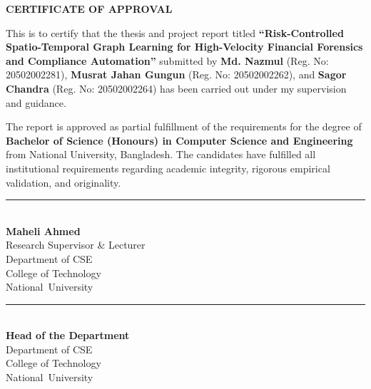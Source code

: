 \begin{center}
   \vspace*{1.0cm}
   {\Large\textbf{CERTIFICATE OF APPROVAL}}\\[1.5cm]
\end{center}

This is to certify that the thesis and project report titled \textbf{``Risk-Controlled Spatio-Temporal Graph Learning for High-Velocity Financial Forensics and Compliance Automation''} submitted by \textbf{Md. Nazmul} (Reg. No: 20502002281), \textbf{Musrat Jahan Gungun} (Reg. No: 20502002262), and \textbf{Sagor Chandra} (Reg. No: 20502002264) has been carried out under my supervision and guidance. 

The report is approved as partial fulfillment of the requirements for the degree of \textbf{Bachelor of Science (Honours) in Computer Science and Engineering} from National University, Bangladesh. The candidates have fulfilled all institutional requirements regarding academic integrity, rigorous empirical validation, and originality.

\vspace{3.5cm}

\noindent
\begin{minipage}[t]{0.48\textwidth}
   \rule{6.0cm}{0.4pt}\\[4pt]
   \textbf{Maheli Ahmed}\\
   Research Supervisor \& Lecturer\\
   Department of CSE\\
   College of Technology\\
   \mbox{National University}
\end{minipage}
\hfill
\begin{minipage}[t]{0.48\textwidth}
   \rule{6.0cm}{0.4pt}\\[4pt]
   \textbf{Head of the Department}\\
   Department of CSE\\
   College of Technology\\
   \mbox{National University}
\end{minipage}
\clearpage
